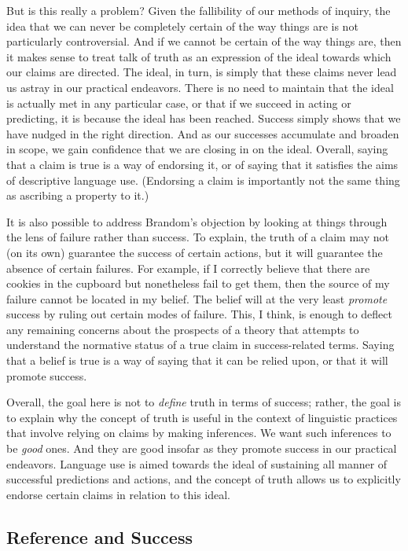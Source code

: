 But is this really a problem? Given the fallibility of our methods of inquiry, the idea that we can never be completely certain of the way things are is not particularly controversial. And if we cannot be certain of the way things are, then it makes sense to treat talk of truth as an expression of the ideal towards which our claims are directed. The ideal, in turn, is simply that these claims never lead us astray in our practical endeavors. There is no need to maintain that the ideal is actually met in any particular case, or that if we succeed in acting or predicting, it is because the ideal has been reached. Success simply shows that we have nudged in the right direction. And as our successes accumulate and broaden in scope, we gain confidence that we are closing in on the ideal. Overall, saying that a claim is true is a way of endorsing it, or of saying that it satisfies the aims of descriptive language use. (Endorsing a claim is importantly not the same thing as ascribing a property to it.) 

It is also possible to address Brandom's objection by looking at things through the lens of failure rather than success. To explain, the truth of a claim may not (on its own) guarantee the success of certain actions, but it will guarantee the absence of certain failures. For example, if I correctly believe that there are cookies in the cupboard but nonetheless fail to get them, then the source of my failure cannot be located in my belief. The belief will at the very least \textit{promote} success by ruling out certain modes of failure. This, I think, is enough to deflect any remaining concerns about the prospects of a theory that attempts to understand the normative status of a true claim in success-related terms. Saying that a belief is true is a way of saying that it can be relied upon, or that it will promote success.

Overall, the goal here is not to \textit{define} truth in terms of success; rather, the goal is to explain why the concept of truth is useful in the context of linguistic practices that involve relying on claims by making inferences. We want such inferences to be \textit{good} ones. And they are good insofar as they promote success in our practical endeavors. Language use is aimed towards the ideal of sustaining all manner of successful predictions and actions, and the concept of truth allows us to explicitly endorse certain claims in relation to this ideal.

\subsection{Reference and Success}

